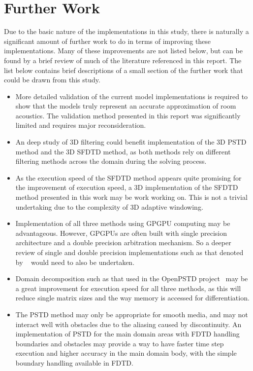 \section{Further Work}
Due to the basic nature of the implementations in this study, there is naturally a significant amount of further work to do in terms of improving these implementations. Many of these improvements are not listed below, but can be found by a brief review of much of the literature referenced in this report. The list below contains brief descriptions of a small section of the further work that could be drawn from this study.
\begin{itemize}
\item More detailed validation of the current model implementations is required to show that the models truly represent an accurate approximation of room acoustics. The validation method presented in this report was significantly limited and requires major reconsideration.
\item An deep study of 3D filtering could benefit implementation of the 3D PSTD method and the 3D SFDTD method, as both methods rely on different filtering methods across the domain during the solving process.
\item As the execution speed of the SFDTD method appears quite promising for the improvement of execution speed, a 3D implementation of the SFDTD method presented in this work may be work working on. This is not a trivial undertaking due to the complexity of 3D adaptive windowing.
\item Implementation of all three methods using GPGPU computing may be advantageous. However, GPGPUs are often built with single precision architecture and a double precision arbitration mechanism. So a deeper review of single and double precision implementations such as that denoted by ~\cite{Murphy2014} would need to also be undertaken.
\item Domain decomposition such as that used in the OpenPSTD project~\cite{Hornikx2016} may be a great improvement for execution speed for all three methods, as this will reduce single matrix sizes and the way memory is accessed for differentiation.
\item The PSTD method may only be appropriate for smooth media, and may not interact well with obstacles due to the aliasing caused by discontinuity. An implementation of PSTD for the main domain areas with FDTD handling boundaries and obstacles may provide a way to have faster time step execution and higher accuracy in the main domain body, with the simple boundary handling available in FDTD.
\end{itemize}